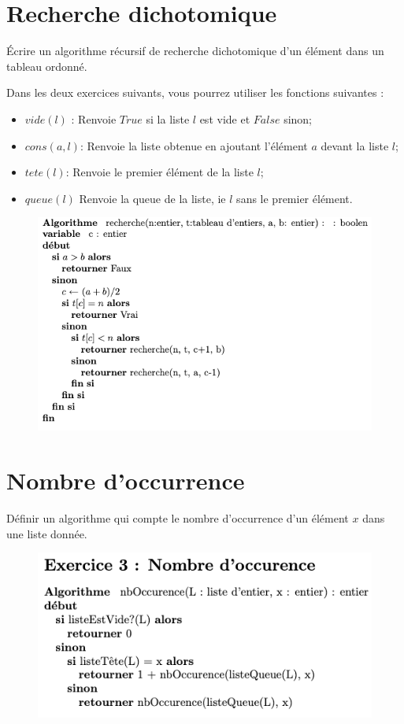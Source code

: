 \documentclass{article}[12pt]
\begin{document}
\section{Recherche dichotomique}
Écrire un algorithme récursif de recherche dichotomique d'un élément dans un tableau ordonné.

Dans les deux exercices suivants, vous pourrez utiliser les fonctions suivantes : 
\begin{itemize}
    \item $vide(l)$ : Renvoie $True$ si la liste $l$ est vide et $False$ sinon;
    \item $cons(a,l)$: Renvoie la liste obtenue en ajoutant l'élément $a$ devant la liste $l$;
    \item $tete(l)$: Renvoie le premier élément de la liste $l$;
    \item $queue(l)$ Renvoie la queue de la liste, ie $l$ sans le premier élément.
\end{itemize}

\begin{figure}[h!]
    \centering
    \includegraphics[scale=0.4]{Dic.png}
    \label{fig:my_label}
\end{figure}

\section{Nombre d'occurrence}
Définir un algorithme qui compte le nombre d'occurrence d'un élément $x$ dans une liste donnée.

\begin{figure}[h!]
    \centering
    \includegraphics[scale=0.4]{Occ.png}
    \label{fig:my_label}
\end{figure}
\end{document}
